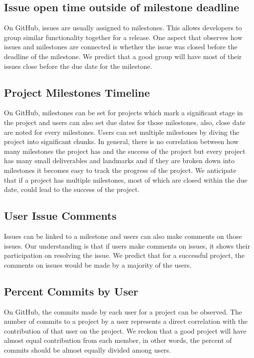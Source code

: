 \documentclass[conference]{IEEEtran}
\begin{document}
\subsection{Issue open time outside of milestone deadline}
On GitHub, issues are usually assigned to milestones. This allows developers to group similar functionality together for a release. One aspect that observes how issues and milestones are connected is whether the issue was closed before the deadline of the milestone. We predict that a good group will have most of their issues close before the due date for the milestone. 

\subsection{Project Milestones Timeline}
On GitHub, milestones can be set for projects which mark a significant stage in the project and users can also set due dates for those milestones, also, close date are noted for every milestones. Users can set multiple milestones by diving the project into significant chunks. In general, there is no correlation between how many milestones the project has and the success of the project but every project has many small deliverables and landmarks and if they are broken down into milestones it becomes easy to track the progress of the project. We anticipate that if a project has multiple milestones, most of which are closed within the due date, could lead to the success of the project.

\subsection{User Issue Comments}
Issues can be linked to a milestone and users can also make comments on those issues. Our understanding is that if users make comments on issues, it shows their participation on resolving the issue. We predict that for a successful project, the comments on issues would be made by a majority of the users.

\subsection{Percent Commits by User}
On GitHub, the commits made by each user for a project can be observed. The number of commits to a project by a user represents a direct correlation with the contribution of that user on the project. We reckon that a good project will have almost equal contribution from each member, in other words, the percent of commits should be almost equally divided among users.
\end{document}
